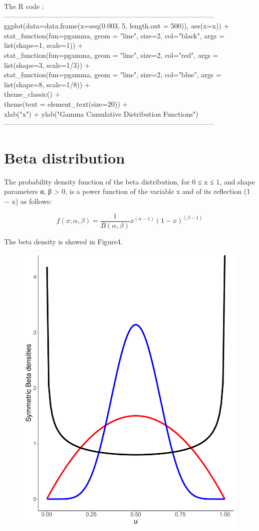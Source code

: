 \documentclass{book} %
\begin{document}
\noindent The R code :\\
------------------------------------------------------------------------------------------\\
ggplot(data=data.frame(x=seq(0.003, 5, length.out = 500)), aes(x=x)) +\\
stat\_function(fun=pgamma, geom = "line", size=2, col="black", args = list(shape=1, scale=1)) +\\
stat\_function(fun=pgamma, geom = "line", size=2, col="red", args = list(shape=3, scale=1/3)) +\\
stat\_function(fun=pgamma, geom = "line", size=2, col="blue", args = list(shape=8, scale=1/8)) +\\
theme\_classic() +\\
theme(text = element\_text(size=20)) +\\
xlab("x") + ylab("Gamma Cumulative Distribution Functions")\\
------------------------------------------------------------------------------------------\\
\section{Beta distribution}
The probability density function of the beta distribution, for 0 ≤ x ≤ 1, and shape parameters α, β > 0, is a power function of the variable x and of its reflection (1 − x) as follows:

\begin{center}
\begin{equation}
f(x;\alpha,\beta)=\frac{1}{B(\alpha,\beta)}x^{(\alpha-1)}(1-x)^{(\beta-1)}
\end{equation} 
\end{center}
The beta density is showed in Figure4.
\begin{figure}[H]
	\centering
	\includegraphics[width=0.7\linewidth,height=0.5\textheight]{beta}
	\caption{}
	\label{fig:beta}
\end{figure}
\end{document}
